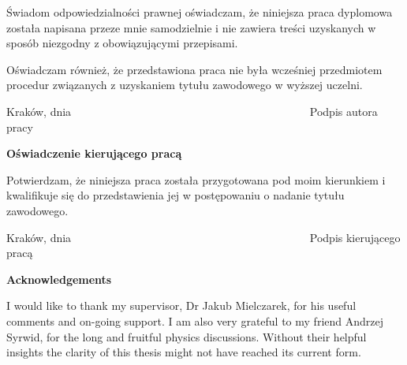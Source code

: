 \documentclass[a4paper,12pt]{article}
\begin{document}
\vspace{0.5cm}


 
Świadom odpowiedzialności prawnej oświadczam, że niniejsza praca dyplomowa została napisana przeze mnie samodzielnie i nie zawiera treści uzyskanych w sposób niezgodny z obowiązującymi przepisami.

Oświadczam również, że przedstawiona praca nie była wcześniej przedmiotem procedur związanych z uzyskaniem tytułu zawodowego w wyższej uczelni.

\vspace{1.0cm}

Kraków, dnia	$\, \, \, \, \, \, \, \, \, \, \, \, \, \, \, \, \, \, \, \, \, \, \, \, \, \, \, \, \, \, \, \, \, \, \, \, \, \, \, \, \, \, \, \, \, \, \, \, \, \, \, \, \, \, \, \, \, \, \, \, \, \, \, \, \, \, \, \, \, \, \, \, \, \, \, \, \, \, \, \, \, \, \, \, \, \, \, \, \, \, \, \, \, \, \, \, \, \, \, \, \, \, \, \, \, \, \, \, \, \, \, \, \, \, \, \, \, \, \, \, \, \, \, \, \, \,$ Podpis autora pracy

\vspace{3.0cm}

\begin{flushleft}
\begin{Large}\textbf{Oświadczenie kierującego pracą}\end{Large}
\end{flushleft}

\vspace{0.5cm}

Potwierdzam, \.ze niniejsza praca zosta\l{}a przygotowana pod moim kierunkiem i kwalifikuje si\k{e} do przedstawienia jej w post\k{e}powaniu o nadanie tytu\l{}u zawodowego.


\vspace{2.0cm}

Kraków, dnia	$\, \, \, \, \, \, \, \, \, \, \, \, \, \, \, \, \, \, \, \, \, \, \, \, \, \, \, \, \, \, \, \, \, \, \, \, \, \, \, \, \, \, \, \, \, \, \, \, \, \, \, \, \, \, \, \, \, \, \, \, \, \, \, \, \, \, \, \, \, \, \, \, \, \, \, \, \, \, \, \, \, \, \, \, \, \, \, \, \, \, \, \, \, \, \, \, \, \, \, \, \, \, \, \, \, \, \, \, \, \, \, \, \, \, \, \, \, \, \, \, \, \, \, \, \, \,$ Podpis kierującego pracą



\newpage\thispagestyle{empty}
\mbox{}
\newpage
\pagebreak

\begin{center}
\begin{large} 
\textbf{Acknowledgements}
\vspace{0.5cm}
\end{large}

\end{center}
\begin{large} 
I would like to thank my supervisor, Dr Jakub Mielczarek, for his useful comments and on-going support. I am also very grateful to my friend Andrzej Syrwid, for the long and fruitful physics discussions. 
Without their helpful insights the clarity of this thesis might not have reached its current form.\end{large}
\end{document}
